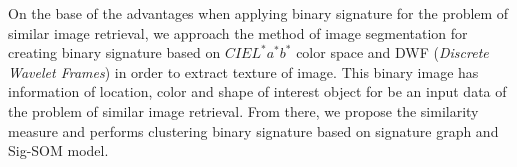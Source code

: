 \documentclass{amcs}
\begin{document}
On the base of the advantages when applying binary signature for the problem of similar image retrieval, we approach the method of image segmentation for creating binary signature based on $CIE{L^*}{a^*}{b^*}$ color space and DWF (\textit{Discrete Wavelet Frames}) in order to extract texture of image. This binary image has information of location, color and shape of interest object for be an input data of the problem of similar image retrieval. From there, we propose the similarity measure and performs clustering binary signature based on signature graph and Sig-SOM model. 





\end{document}
